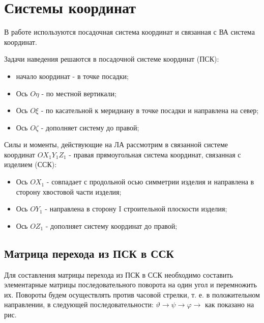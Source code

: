 \section{Системы координат}
В работе используются посадочная система координат и связанная с ВА система координат.

Задачи наведения решаются в посадочной системе координат (ПСК):
\begin{itemize}
	\item начало координат - в точке посадки;
	\item Ось $O \eta$ - по местной вертикали;
	\item Ось $O \xi$ - по касательной к меридиану в точке посадки и направлена на север;
	\item Ось $O \zeta$ - дополняет систему до правой;
\end{itemize}


Силы и моменты, действующие на ЛА рассмотрим в связанной системе координат $O X_1 Y_1 Z_1$ - правая прямоугольная система координат, связанная с изделием (ССК):
\begin{itemize}
	\item Ось $O X_1$ - совпадает с продольной осью симметрии изделия и направлена в сторону хвостовой части изделия;
	\item Ось $O Y_1$ - направлена в сторону I строительной плоскости изделия;
	\item Ось $O Z_1$ - дополняет систему координат до правой;
\end{itemize}

\clearpage



\clearpage


\clearpage

\subsection{Матрица перехода из ПСК в ССК}
Для составления матрицы перехода из ПСК в ССК необходимо составить элементарные матрицы последовательного поворота на один угол и перемножить их. Повороты будем осуществлять против часовой стрелки, т. е. в положительном направлении, в следующей последовательности: $\vartheta \rightarrow \psi \rightarrow \varphi \rightarrow$ как показано на рис. 

